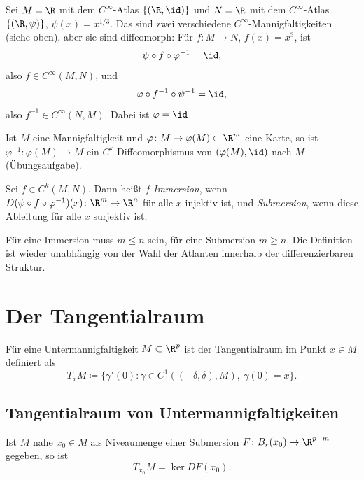 \documentclass[11pt]{article}
\begin{document}
\begin{example}
  Sei $M = \R$ mit dem $C^\infty$-Atlas $\{(\R, \id)\}$ und $N = \R$ mit dem $C^\infty$-Atlas $\{(\R, \psi)\}$, $\psi(x) = x^{1/3}$. Das sind zwei verschiedene $C^\infty$-Mannigfaltigkeiten (siehe oben), aber sie sind diffeomorph: Für $f\colon M \to N$, $f(x) = x^3$, ist
  \[ \psi \circ f \circ \varphi^{-1} = \id, \]
  also $f \in C^\infty(M, N)$, und
  \[ \varphi \circ f^{-1} \circ \psi^{-1} = \id, \]
  also $f^{-1} \in C^\infty(N, M)$. Dabei ist $\varphi = \id$.
\end{example}


\begin{note}
  Ist $M$ eine Mannigfaltigkeit und $\varphi\colon M \to \varphi(M) \subset \R^m$ eine Karte, so ist $\varphi^{-1}\colon \varphi(M) \to M$ ein $C^k$-Diffeomorphismus von $(\varphi(M), \id)$ nach $M$ (Übungsaufgabe).
\end{note}


\begin{definition}\Theorem
  Sei $f \in C^k(M, N)$. Dann heißt $f$ \emph{Immersion}, wenn $D(\psi \circ f \circ \varphi^{-1})(x)\colon \R^m \to \R^n$ für alle $x$ injektiv ist, und \emph{Submersion}, wenn diese Ableitung für alle $x$ surjektiv ist.
\end{definition}

\begin{note}
  Für eine Immersion muss $m \le n$ sein, für eine Submersion $m \ge n$. Die Definition ist wieder unabhängig von der Wahl der Atlanten innerhalb der differenzierbaren Struktur.
\end{note}

\section{Der Tangentialraum}

Für eine Untermannigfaltigkeit $M \subset \R^p$ ist der Tangentialraum im Punkt $x \in M$ definiert als
\[ T_x M \coloneqq \bigl\{ \gamma'(0) : \gamma \in C^1((-\delta, \delta), M),\ \gamma(0) = x \bigr\}. \]


\subsection{Tangentialraum von Untermannigfaltigkeiten}

\begin{note}
  Ist $M$ nahe $x_0 \in M$ als Niveaumenge einer Submersion $F\colon B_r(x_0) \to \R^{p-m}$ gegeben, so ist
  \[ T_{x_0} M = \ker DF(x_0). \]
\end{note}
\end{document}
